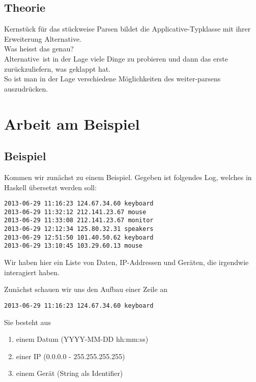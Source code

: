 \documentclass{beamer}
\begin{document}
\subsection{Theorie}
\begin{frame}[fragile]
Kernstück für das stückweise Parsen bildet die Applicative-Typklasse mit ihrer Erweiterung \glqq Alternative\grqq .\\
\pause
\bigskip
Was heisst das genau?\\
\bigskip
\pause
\glqq Alternative\grqq \  ist in der Lage viele Dinge zu probieren und dann das erste zurückzuliefern, was geklappt hat.\\
So ist man in der Lage verschiedene Möglichkeiten des weiter-parsens auszudrücken.
\end{frame}

\section{Arbeit am Beispiel}
\subsection{Beispiel}
\begin{frame}[fragile]
Kommen wir zunächst zu einem Beispiel. Gegeben ist folgendes Log, welches in Haskell übersetzt werden soll:
\small
\begin{verbatim}
2013-06-29 11:16:23 124.67.34.60 keyboard
2013-06-29 11:32:12 212.141.23.67 mouse
2013-06-29 11:33:08 212.141.23.67 monitor
2013-06-29 12:12:34 125.80.32.31 speakers
2013-06-29 12:51:50 101.40.50.62 keyboard
2013-06-29 13:10:45 103.29.60.13 mouse
\end{verbatim}
\normalsize
Wir haben hier ein Liste von Daten, IP-Addressen und Geräten, die irgendwie interagiert haben.
\end{frame}

\begin{frame}[fragile]
Zunächst schauen wir uns den Aufbau einer Zeile an
\begin{verbatim}
2013-06-29 11:16:23 124.67.34.60 keyboard
\end{verbatim}
\pause
Sie besteht aus
\begin{enumerate}
 \item einem Datum (YYYY-MM-DD hh:mm:ss)
 \item einer IP (0.0.0.0 - 255.255.255.255)
 \item einem Gerät (String als Identifier)
\end{enumerate}
\end{frame}
\end{document}
